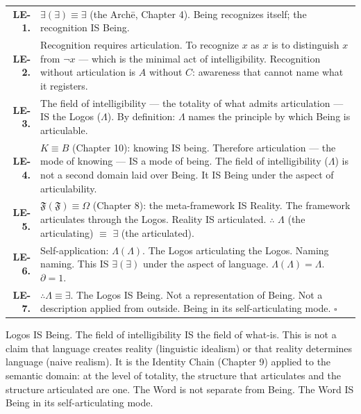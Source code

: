 \documentclass[10pt, openany, oneside]{book}
\renewcommand{\footnotesize}{\fontsize{8.5}{11}\selectfont}
\begin{document}
{\footnotesize
\noindent\begin{tabular}{r p{}}
\textbf{LE-1.} & $\exists(\exists) \equiv \exists$ (the Arch\={e}, Chapter 4). Being recognizes itself; the recognition IS Being. \\[0.3em]
\textbf{LE-2.} & Recognition requires articulation. To recognize $x$ as $x$ is to distinguish $x$ from $\neg x$ --- which is the minimal act of intelligibility. Recognition without articulation is $A$ without $C$: awareness that cannot name what it registers. \\[0.3em]
\textbf{LE-3.} & The field of intelligibility --- the totality of what admits articulation --- IS the Logos ($\Lambda$). By definition: $\Lambda$ names the principle by which Being is articulable. \\[0.3em]
\textbf{LE-4.} & $K \equiv B$ (Chapter 10): knowing IS being. Therefore articulation --- the mode of knowing --- IS a mode of being. The field of intelligibility ($\Lambda$) is not a second domain laid over Being. It IS Being under the aspect of articulability. \\[0.3em]
\textbf{LE-5.} & $\mathfrak{F}(\mathfrak{F}) \equiv \Omega$ (Chapter 8): the meta-framework IS Reality. The framework articulates through the Logos. Reality IS articulated. $\therefore$ $\Lambda$ (the articulating) $\equiv$ $\exists$ (the articulated). \\[0.3em]
\textbf{LE-6.} & Self-application: $\Lambda(\Lambda)$. The Logos articulating the Logos. Naming naming. This IS $\exists(\exists)$ under the aspect of language. $\Lambda(\Lambda) = \Lambda$. $\partial = 1$. \\[0.3em]
\textbf{LE-7.} & $\therefore \Lambda \equiv \exists$. The Logos IS Being. Not a representation of Being. Not a description applied from outside. Being in its self-articulating mode. $\square$ \\[0.3em]
\end{tabular}
}

\vspace{0.8em}

\noindent Logos IS Being. The field of intelligibility IS the field of what-is. This is not a claim that language creates reality (linguistic idealism) or that reality determines language (naive realism). It is the Identity Chain (Chapter 9) applied to the semantic domain: at the level of totality, the structure that articulates and the structure articulated are one. The Word is not separate from Being. The Word IS Being in its self-articulating mode.
\end{document}
